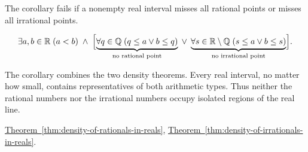 \begin{remark*}
The corollary fails if a nonempty real interval misses all rational points or misses all irrational points.
\end{remark*}

\begin{remark*}
\[
\exists a,b\in\mathbb{R}\;(a<b)
\;\land\;
\Bigl[
\underbrace{\forall q\in\mathbb{Q}\;(q\le a\lor b\le q)}_{\text{no rational point}}
\;\lor\;
\underbrace{\forall s\in\mathbb{R}\setminus\mathbb{Q}\;(s\le a\lor b\le s)}_{\text{no irrational point}}
\Bigr].
\]
\end{remark*}

\begin{remark*}[Interpretation]
The corollary combines the two density theorems. Every real interval, no matter how small, contains representatives of both arithmetic types. Thus neither the rational numbers nor the irrational numbers occupy isolated regions of the real line.
\end{remark*}

\begin{dependencies}
\hyperref[thm:density-of-rationals-in-reals]{Theorem~\ref*{thm:density-of-rationals-in-reals}},
\hyperref[thm:density-of-irrationals-in-reals]{Theorem~\ref*{thm:density-of-irrationals-in-reals}}.
\end{dependencies}








